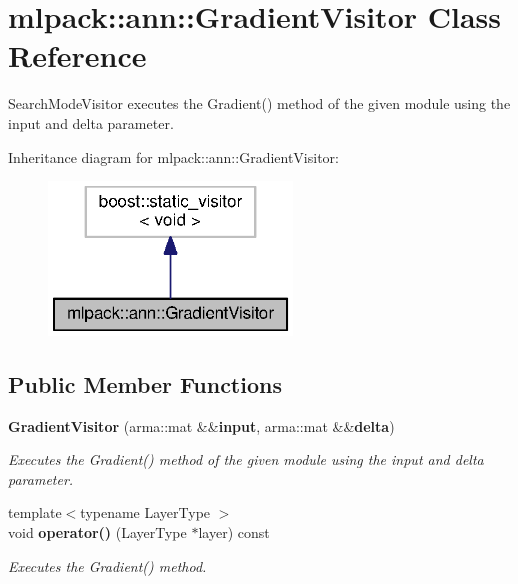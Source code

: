 \section{mlpack\+:\+:ann\+:\+:Gradient\+Visitor Class Reference}
\label{classmlpack_1_1ann_1_1GradientVisitor}


Search\+Mode\+Visitor executes the Gradient() method of the given module using the input and delta parameter.  




Inheritance diagram for mlpack\+:\+:ann\+:\+:Gradient\+Visitor\+:
\nopagebreak
\begin{figure}[H]
\begin{center}
\leavevmode
\includegraphics[width=184pt]{classmlpack_1_1ann_1_1GradientVisitor__inherit__graph}
\end{center}
\end{figure}
\subsection*{Public Member Functions}
\begin{DoxyCompactItemize}
\item 
{\bf Gradient\+Visitor} (arma\+::mat \&\&{\bf input}, arma\+::mat \&\&{\bf delta})
\begin{DoxyCompactList}\small\item\em Executes the Gradient() method of the given module using the input and delta parameter. \end{DoxyCompactList}\item 
{\footnotesize template$<$typename Layer\+Type $>$ }\\void {\bf operator()} (Layer\+Type $\ast$layer) const 
\begin{DoxyCompactList}\small\item\em Executes the Gradient() method. \end{DoxyCompactList}\end{DoxyCompactItemize}
